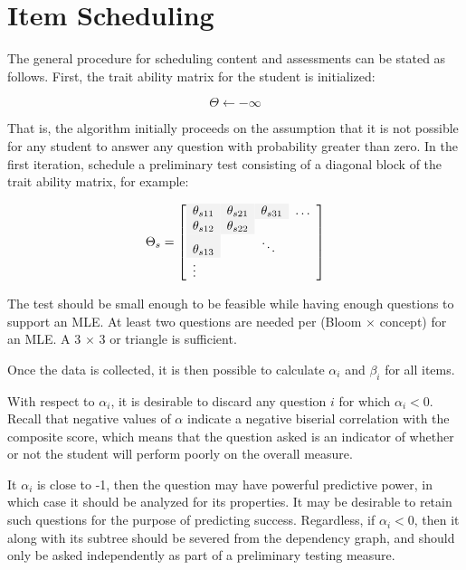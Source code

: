 \section{Item Scheduling}

The general procedure for scheduling content and assessments can be stated as
follows.  First, the trait ability matrix for the student is initialized:

\begin{equation}
  \Theta \leftarrow -\infty
\end{equation}

That is, the algorithm initially proceeds on the assumption that it is not
possible for any student to answer any question with probability greater than
zero.  In the first iteration, schedule a preliminary test consisting of a
diagonal block of the trait ability matrix, for example:

\begin{equation}
\Theta_s =\left[
         \begin{array}{llll}
              \y\theta_{s11} & \y\theta_{s21} & \y\theta_{s31} & \ldots \\
              \y\theta_{s12} & \y\theta_{s22} &                &        \\
              \y\theta_{s13} &                & \ddots          &        \\
              \vdots         &                &                 &        \\
         \end{array}
       \right]
\end{equation}

The test should be small enough to be feasible while having enough questions to
support an MLE.  At least two questions are needed per (Bloom $\times$ concept)
for an MLE.  A 3 $\times$ 3 or triangle is sufficient.

Once the data is collected, it is then possible to calculate $\alpha_i$ and
$\beta_i$ for all items. 

With respect to $\alpha_i$, it is desirable to discard any question $i$ for
which $\alpha_i < 0$.  Recall that negative values of $\alpha$ indicate a
negative biserial correlation with the composite score, which means that the
question asked is an indicator of whether or not the student will perform
poorly on the overall measure.  

It $\alpha_i$ is close to -1, then the question may have powerful predictive
power, in which case it should be analyzed for its properties.  It may be
desirable to retain such questions for the purpose of predicting success.
Regardless, if $\alpha_i < 0$, then it along with its subtree should be severed
from the dependency graph, and should only be asked independently as part
of a preliminary testing measure.

